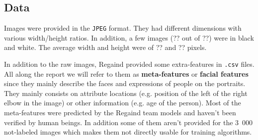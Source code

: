     
    \subsection{Data}
    
    Images were provided in the \texttt{JPEG} format. They had different dimensions with various width/height ratios. In addition, a few images (?? out of ??) were in black and white. The average width and height were of ?? and ?? pixels.
    
    In addition to the raw images, Regaind provided some extra-features	in \texttt{.csv} files. All along the report we will refer to them as \textbf{meta-features} or \textbf{facial features} since they mainly describe the faces and expressions of people on the portraits. They mainly consists on attribute locations (e.g. position of the left of the right elbow in the image) or other information (e.g. age of the person). Most of the meta-features were predicted by the Regaind team models and haven't been verified by human beings. In addition some of them aren't provided for the 3~000 not-labeled images which makes them not directly usable for training algorithms.
    
